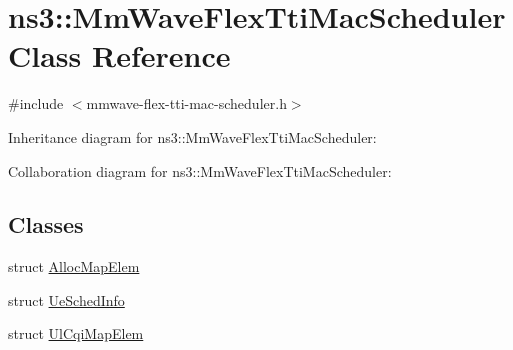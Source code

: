 \hypertarget{classns3_1_1MmWaveFlexTtiMacScheduler}{}\section{ns3\+:\+:Mm\+Wave\+Flex\+Tti\+Mac\+Scheduler Class Reference}
\label{classns3_1_1MmWaveFlexTtiMacScheduler}


{\ttfamily \#include $<$mmwave-\/flex-\/tti-\/mac-\/scheduler.\+h$>$}



Inheritance diagram for ns3\+:\+:Mm\+Wave\+Flex\+Tti\+Mac\+Scheduler\+:


Collaboration diagram for ns3\+:\+:Mm\+Wave\+Flex\+Tti\+Mac\+Scheduler\+:
\subsection*{Classes}
\begin{DoxyCompactItemize}
\item 
struct \hyperlink{structns3_1_1MmWaveFlexTtiMacScheduler_1_1AllocMapElem}{Alloc\+Map\+Elem}
\item 
struct \hyperlink{structns3_1_1MmWaveFlexTtiMacScheduler_1_1UeSchedInfo}{Ue\+Sched\+Info}
\item 
struct \hyperlink{structns3_1_1MmWaveFlexTtiMacScheduler_1_1UlCqiMapElem}{Ul\+Cqi\+Map\+Elem}
\end{DoxyCompactItemize}
